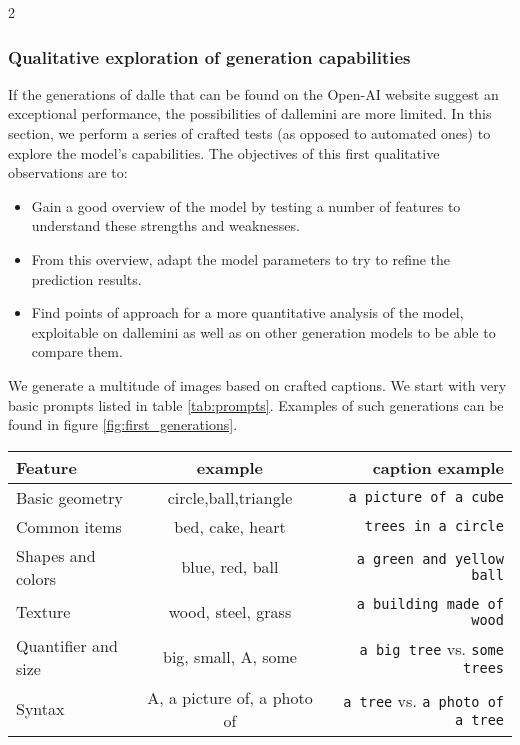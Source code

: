\documentclass{article}
\begin{document}
\begin{multicols}{2}
\subsubsection{Qualitative exploration of generation capabilities}\label{subsubsection:qualitativegeneration}

If the generations of \gls{dalle} that can be found on the Open-AI website suggest an exceptional performance, the possibilities of \gls{dallemini} are more limited. In this section, we perform a series of crafted tests (as opposed to automated ones) to explore the model's capabilities. The objectives of this first qualitative observations are to:

\begin{itemize}
    \item Gain a good overview of the model by testing a number of features to understand these strengths and weaknesses.
    \item From this overview, adapt the model parameters to try to refine the prediction results. 
    \item Find points of approach for a more quantitative analysis of the model, exploitable on \gls{dallemini} as well as on other generation models to be able to compare them.
\end{itemize}

We generate a multitude of images based on crafted captions. We start with very basic prompts listed in table \ref{tab:prompts}. Examples of such generations can be found in figure \ref{fig:first_generations}.

\begin{table*}[]
    \centering
    \begin{tabular}{|l|c|r|}
        \hline
        Feature & example & caption example \tabularnewline
        \hline
        Basic geometry & circle,ball,triangle & \texttt{a picture of a cube} \tabularnewline \hline
        Common items & bed, cake, heart & \texttt{trees in a circle} \tabularnewline \hline
        Shapes and colors & blue, red, ball & \texttt{a green and yellow ball} \tabularnewline \hline
        Texture & wood, steel, grass & \texttt{a building made of wood}\tabularnewline \hline 
        Quantifier and size & big, small, A, some & \texttt{a big tree} vs. \texttt{some trees} \tabularnewline \hline
        Syntax & A, a picture of, a photo of & \texttt{a tree} vs. \texttt{a photo of a tree} \tabularnewline
        \hline
    \end{tabular}
    \caption{Prompts construction for testing basic features of image generation}
    \label{tab:prompts}
\end{table*}


\end{multicols}
\end{document}
